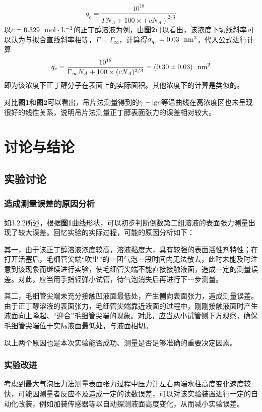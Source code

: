 \documentclass[12pt]{article}
\begin{document}
$$
q_{c}=\frac{10^{18}}{\Gamma N_{A}+100\times(cN_{A})^{2/3}}
$$
以$c=0.329\ \ {\rm mol\cdot L^{-1}}$的正丁醇溶液为例，由\textbf{图2}可以看出，该浓度下切线斜率可以认为与拟合直线斜率相等，$\Gamma=\Gamma_{\infty}$，计算得$\sigma_{q_{c}}=0.03\ \ {\rm nm^{2}}$，代入公式进行计算
$$
q_{c}=\frac{10^{18}}{\Gamma_{\infty} N_{A}+100\times(cN_{A})^{2/3}}=(0.30\pm 0.03)\ \ {\rm nm^{2}}
$$
即为该浓度下正丁醇分子在表面上的实际面积。其他浓度下的计算是类似的。
\par 

对比\textbf{图1}和\textbf{图2}可以看出，吊片法测量得到的$\gamma-{\rm lg}c$等温曲线在高浓度区也未呈现很好的线性关系，说明吊片法测量正丁醇表面张力的误差相对较大。



 
 	 \section{讨论与结论}
		\subsection{实验讨论}
 			\subsubsection{造成测量误差的原因分析}
如3.2.2所述，根据\textbf{图1}曲线形状，可以初步判断倒数第二组溶液的表面张力测量出现了较大误差。回忆实验的实际过程，可能的原因分析如下：\par 
其一，由于该正丁醇溶液浓度较高，溶液黏度大，具有较强的表面活性剂特性；在打开活塞后，毛细管尖端“吹出”的一团气泡一段时间内无法散去，此时未能及时注意到该现象而继续进行实验，使毛细管尖端不能直接接触液面，造成一定的测量误差。对此，应当用手指轻弹小试管，待气泡消失后再进行下一步测量。\par 
其二，毛细管尖端未充分接触凹液面最低处，产生侧向表面张力，造成测量误差。由于正丁醇溶液的表面张力，毛细管尖端靠近液面的过程中，刚刚接触液面时产生液面向上隆起、“迎合”毛细管尖端的现象。对此，应当从小试管侧下方观察，确保毛细管尖端位于实际液面最低处，与液面相切。\par 
以上两个原因也是本次实验能否成功、测量是否足够准确的重要决定因素。
 	 	\subsubsection{实验改进}
考虑到最大气泡压力法测量表面张力过程中压力计左右两端水柱高度变化速度较快，可能因测量者反应不及造成一定的读数误差，可以对该实验装置进行一定的自动化改装，例如加装传感器等以自动探测液面高度变化，从而减小实验误差。 
\end{document}
